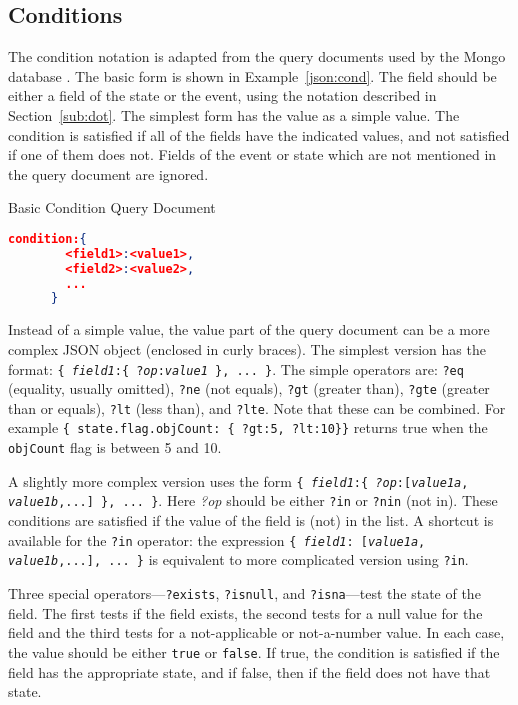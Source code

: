 \documentclass{article}
\begin{document}
  \subsection{Conditions}
  \label{sub:cond}

  The condition notation is adapted from the query documents used by
  the Mongo database \cite{mongo}.  The basic form is shown in
  Example~\ref{json:cond}.  The field should be
  either a field of the state or the event, using the notation
  described in Section~\ref{sub:dot}.  The simplest form has the value
  as a simple value.  The condition is satisfied if all of the fields
  have the indicated values, and not satisfied if one of them does
  not.  Fields of the event or state which are not mentioned in the
  query document are ignored.

  \begin{algorithm}
    \caption{Basic Condition Query Document}
    \label{json:cond}
    \begin{lstlisting}[language=json]
      condition:{
        <field1>:<value1>,
        <field2>:<value2>,
        ...
      }
    \end{lstlisting}
  \end{algorithm}

  Instead of a simple value, the value part of the query document can
  be a more complex JSON object (enclosed in curly braces).  The
  simplest version has the format:  \texttt{\{ \textit{field1}:\{
    ?\textit{op}:\textit{value1} \}, ... \}}.  The simple operators
  are: \texttt{?eq} (equality, usually omitted), \texttt{?ne} (not
  equals), \texttt{?gt} (greater than), \texttt{?gte} (greater than
  or equals), \texttt{?lt} (less than), and \texttt{?lte}.  Note
  that these can be combined.  For example
  \verb|{ state.flag.objCount: { ?gt:5, ?lt:10}}| returns true when
  the \texttt{objCount} flag is between 5 and 10.

  A slightly more complex version uses the form \texttt{\{ \textit{field1}:\{
    \textit{?op}:[\textit{value1a}, \textit{value1b},...] \},
    ... \}}.  Here \textit{?op} should be either \texttt{?in} or
  \texttt{?nin} (not in).  These conditions are satisfied if the
  value of the field is (not) in the list.  A shortcut is available
  for the \texttt{?in} operator:  the expression \texttt{\{
    \textit{field1}: [\textit{value1a}, \textit{value1b},...], ... \}}
  is equivalent to more complicated version using \texttt{?in}.

  Three special operators---\texttt{?exists}, \texttt{?isnull}, and
  \texttt{?isna}---test the state of the field.  The first tests if
  the field exists, the second tests for a null value for the field
  and the third tests for a not-applicable or not-a-number value.  In
  each case, the value should be either \texttt{true} or
  \texttt{false}.  If true, the condition is satisfied if the field
  has the appropriate state, and if false, then if the field does not
  have that state.
\end{document}
